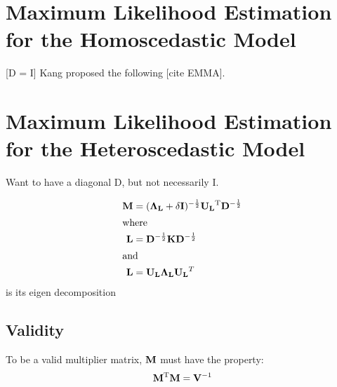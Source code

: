 \section{Maximum Likelihood Estimation for the Homoscedastic Model}

[D = I]
Kang proposed the following [cite EMMA].




\section{Maximum Likelihood Estimation for the Heteroscedastic Model}

Want to have a diagonal D, but not necessarily I.

\begin{align}
	\mathbf{M} &= (\mathbf{\Lambda_L} + \delta \mathbf{I})^{-\frac{1}{2}}\mathbf{U_L}^\mathrm{T} \mathbf{D}^{-\frac{1}{2}}\\
\intertext{where}
	\mathbf{L} &= \mathbf{D}^{-\frac{1}{2}}\mathbf{K} \mathbf{D}^{-\frac{1}{2}}\\
\intertext{and}
	\mathbf{L} &= \mathbf{U_L} \mathbf{\Lambda_L} \mathbf{U_L}^T
\end{align}
is its eigen decomposition


\subsection{Validity}

To be a valid multiplier matrix, $\mathbf{M}$ must have the property:
\[
	\mathbf{M} ^\mathrm{T} \mathbf{M} = \mathbf{V}^{-1}
\]





